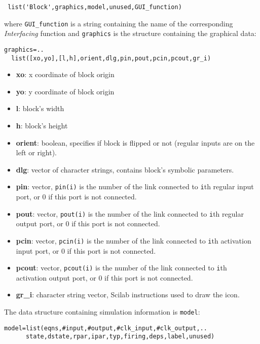 \documentclass{article}
\newcommand{\interfacing}{{\em Interfacing }}
\begin{document}
\begin{verbatim}
 list('Block',graphics,model,unused,GUI_function)
\end{verbatim}
where {\tt GUI\_function} is a string containing the name of the
corresponding \interfacing function and
{\tt graphics} is the structure containing the graphical data:
\begin{verbatim}
graphics=..
  list([xo,yo],[l,h],orient,dlg,pin,pout,pcin,pcout,gr_i)
\end{verbatim}
\begin{itemize}
\item \textbf{xo}: x coordinate of block origin
\item \textbf{yo}: y coordinate of block origin
\item \textbf{l}: block's width
\item \textbf{h}: block's height
\item \textbf{orient}:  boolean, specifies if block is flipped or not (regular
inputs are on the left or right).
\item \textbf{dlg}: \label{dlg2} vector of character strings, contains block's
symbolic parameters.
\item \textbf{pin}: vector, {\tt pin(i)} is  the number  of the link
connected to {\tt i}th regular input port, or 0 if this port is not
connected. 
\item \textbf{pout}: vector, {\tt pout(i)} is  the number  of the link
  connected to {\tt i}th regular output port, or 0 if this port is not
  connected.
\item \textbf{pcin}: vector, {\tt pcin(i)} is  the number  of the link
  connected to {\tt i}th activation input port, or 0 if this port is not
  connected.
\item \textbf{pcout}: vector, {\tt pcout(i)} is  the number  of the link
  connected to {\tt i}th activation output port, or 0 if this port is not
  connected.
\item \textbf{gr\_i}: character string vector, Scilab instructions used to draw
  the icon.
\end{itemize}
The data structure containing simulation information is {\tt model}:
\label{model}
\begin{verbatim}
model=list(eqns,#input,#output,#clk_input,#clk_output,..
      state,dstate,rpar,ipar,typ,firing,deps,label,unused)
\end{verbatim}
\end{document}
